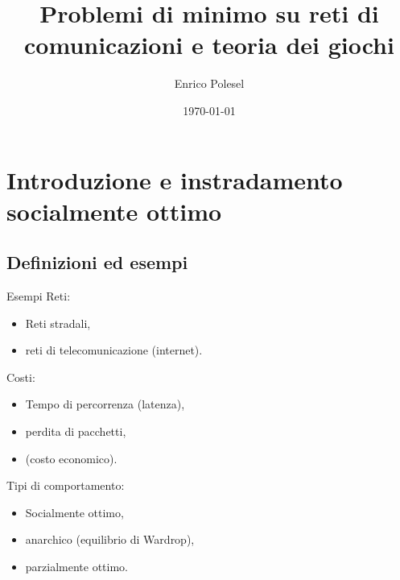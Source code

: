 \documentclass{beamer}
\title{Problemi di minimo su reti di comunicazioni e teoria dei giochi}
\date{\today}
\author{Enrico Polesel}
\theoremstyle{plain}
\theoremstyle{definition}
\theoremstyle{remark}
\begin{document}
\maketitle



\section{Introduzione e instradamento socialmente ottimo}

\subsection{Definizioni ed esempi}

\begin{frame}{Esempi}
  Reti:
  \begin{itemize}
  \item Reti stradali,
  \item reti di telecomunicazione (internet).
  \end{itemize}

  Costi:
  \begin{itemize}
  \item Tempo di percorrenza (latenza),
  \item perdita di pacchetti,
  \item (costo economico).
  \end{itemize}

  Tipi di comportamento:
  \begin{itemize}
  \item Socialmente ottimo,
  \item anarchico (equilibrio di Wardrop),
  \item parzialmente ottimo.
  \end{itemize}
\end{frame}
\end{document}
